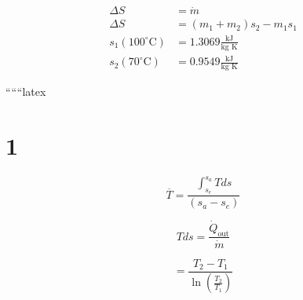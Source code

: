 \begin{align*}
\Delta S &= \dot{m} \\
\Delta S &= (m_1 + m_2) s_2 - m_1 s_1 \\
s_1 (100^\circ \text{C}) &= 1.3069 \frac{\text{kJ}}{\text{kg K}} \\
s_2 (70^\circ \text{C}) &= 0.9549 \frac{\text{kJ}}{\text{kg K}}
\end{align*}

``````latex


\section*{1}

\[
\overline{T} = \frac{\int_{s_e}^{s_a} T ds}{(s_a - s_e)}
\]

\[
T ds = \frac{\dot{Q}_{\text{out}}}{\dot{m}}
\]

\[
= \frac{T_2 - T_1}{\ln \left( \frac{T_2}{T_1} \right)}
\]


